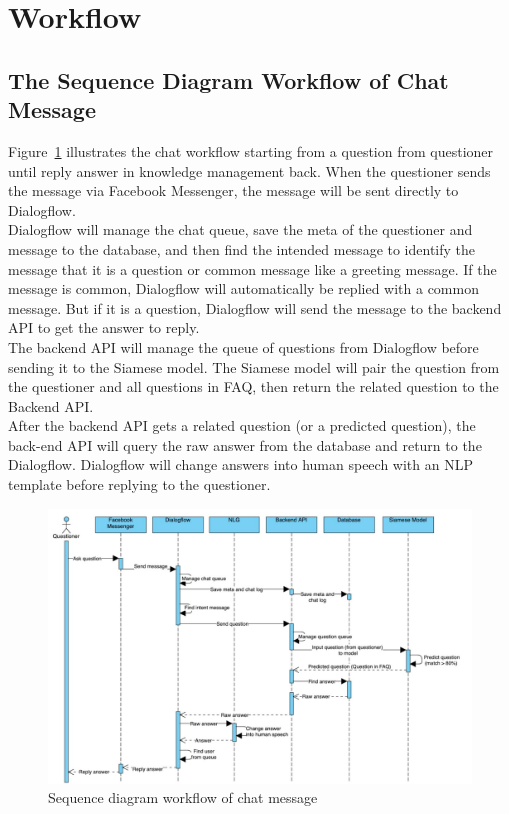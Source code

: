 \documentclass[12pt,oneside,openright,a4paper]{cpe-english-project}
\begin{document}
\pagebreak

\section{Workflow}
\subsection{The Sequence Diagram Workflow of Chat Message}
Figure~\ref*{fig:Sequence diagram workflow of chat message} illustrates the chat workflow starting from a question from questioner until reply answer in knowledge management back. When the questioner sends the message via Facebook Messenger, the message will be sent directly to Dialogflow.\\
Dialogflow will manage the chat queue, save the meta of the questioner and message to the database, and then find the intended message to identify the message that it is a question or common message like a greeting message. If the message is common, Dialogflow will automatically be replied with a common message. But if it is a question, Dialogflow will send the message to the backend API to get the answer to reply.\\
The backend API will manage the queue of questions from Dialogflow before sending it to the Siamese model. The Siamese model will pair the question from the questioner and all questions in FAQ, then return the related question to the Backend API.\\
After the backend API gets a related question (or a predicted question), the back-end API will query the raw answer from the database and return to the Dialogflow. Dialogflow will change answers into human speech with an NLP template before replying to the questioner.
\begin{figure}[!h]
	\includegraphics[width=14cm]{img/ch3/sequence diagram of chat message.jpg}
	\caption{Sequence diagram workflow of chat message}\label{fig:Sequence diagram workflow of chat message}
\end{figure}
\end{document}
